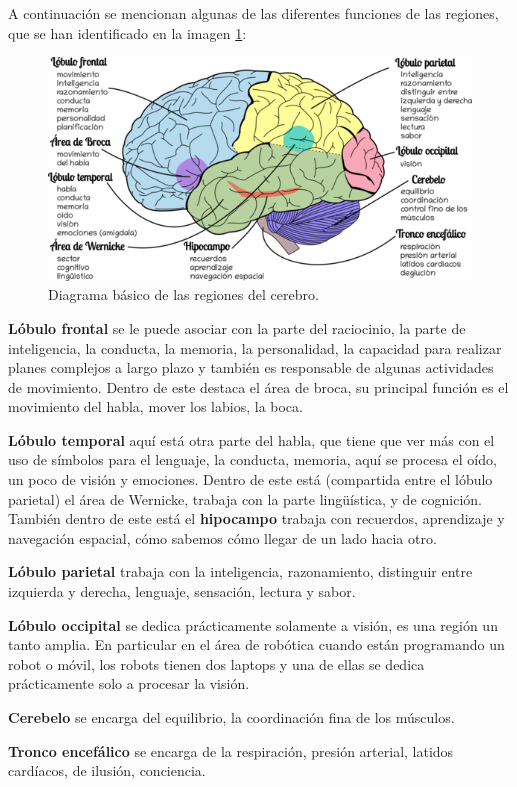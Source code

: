 A continuación se mencionan algunas de las diferentes funciones de las regiones, que se han identificado en la imagen \ref{cerebro}: 


 \begin{figure}[h]
  \centering
  \includegraphics[scale=0.7]{../Figuras/cerebro.png}
  \caption{Diagrama básico de las regiones del cerebro.}\label{cerebro}
 \end{figure}


\begin{description}
 \item \textbf{Lóbulo frontal} se le puede asociar con la parte del raciocinio,  la parte de inteligencia, la conducta, la memoria, la personalidad, la capacidad para realizar planes complejos a largo plazo y también es responsable de algunas actividades de movimiento. Dentro de este destaca el área de broca, su principal función es el movimiento del habla, mover los labios, la boca.
 \item \textbf{Lóbulo temporal} aquí está otra parte del habla, que tiene que ver más con el uso de símbolos para el lenguaje, la conducta, memoria, aquí se procesa el oído, un poco de visión y emociones. Dentro de este está (compartida entre el lóbulo parietal) el área de Wernicke, trabaja con la parte lingüística, y de cognición. También dentro de este está el \textbf{hipocampo} trabaja con recuerdos, aprendizaje y navegación espacial, cómo sabemos cómo llegar de un lado hacia otro.
 \item \textbf{Lóbulo parietal} trabaja con la inteligencia, razonamiento, distinguir entre izquierda y derecha, lenguaje, sensación, lectura y sabor. 
 \item \textbf{Lóbulo occipital} se dedica prácticamente solamente a visión, es una región un tanto amplia. En particular en el área de robótica cuando están programando un robot o móvil, los robots tienen dos laptops y una de ellas se dedica prácticamente solo a procesar la visión.
 \item \textbf{Cerebelo} se encarga del equilibrio, la coordinación fina de los músculos.
 \item \textbf{Tronco encefálico} se encarga de la respiración, presión arterial, latidos cardíacos, de ilusión, conciencia. 
\end{description}


